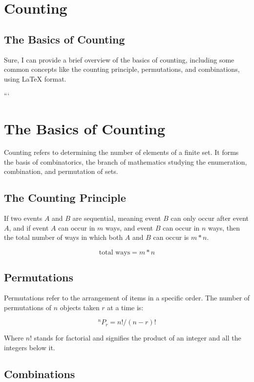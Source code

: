 \section{Counting}
\subsection{The Basics of Counting}
Sure, I can provide a brief overview of the basics of counting, including some common concepts like the counting principle, permutations, and combinations, using LaTeX format. 

```
\section{The Basics of Counting}

Counting refers to determining the number of elements of a finite set. It forms the basis of combinatorics, the branch of mathematics studying the enumeration, combination, and permutation of sets.

\subsection{The Counting Principle}

If two events $A$ and $B$ are sequential, meaning event $B$ can only occur after event $A$, and if event $A$ can occur in $m$ ways, and event $B$ can occur in $n$ ways, then the total number of ways in which both $A$ and $B$ can occur is $m*n$.

\begin{equation}
\text{{total ways}} = m * n
\end{equation}

\subsection{Permutations}

Permutations refer to the arrangement of items in a specific order. The number of permutations of $n$ objects taken $r$ at a time is:

\begin{equation}
^nP_r = n! / (n-r)!
\end{equation}

Where $n!$ stands for factorial and signifies the product of an integer and all the integers below it.

\subsection{Combinations}


